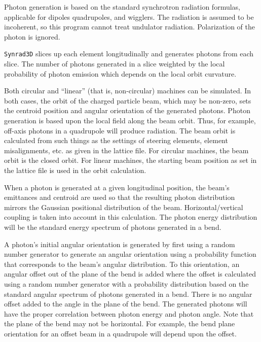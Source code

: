 \documentclass[11pt]{article}
\newcommand{\srthree}{\texttt{Synrad3D}\xspace}
\begin{document}
Photon generation is based on the standard synchrotron radiation
formulas, applicable for dipoles quadrupoles, and wigglers. The
radiation is assumed to be incoherent, so this program cannot treat
undulator radiation. Polarization of the photon is ignored.

\srthree slices up each element longitudinally
and generates photons from each slice. The number of photons generated
in a slice weighted by the local probability of photon emission which
depends on the local orbit curvature.

Both circular and ``linear'' (that is, non-circular) machines can be
simulated.  In both cases, the orbit of the charged particle beam,
which may be non-zero, sets the centroid position and angular
orientation of the generated photons. Photon generation is based upon
the local field along the beam orbit. Thus, for example, off-axis
photons in a quadrupole will produce radiation. The beam orbit is
calculated from such things as the settings of steering elements,
element misalignments, etc. as given in the lattice file. For circular
machines, the beam orbit is the closed orbit. For linear machines, the
starting beam position as set in the lattice file is used in the orbit
calculation.

When a photon is generated at a given longitudinal position, the
beam's emittances and centroid are used so that the resulting photon
distribution mirrors the Gaussian positional distribution of the beam.
Horizontal/vertical coupling is taken into account in this
calculation. The photon energy distribution will be the standard
energy spectrum of photons generated in a bend.

A photon's initial angular orientation is generated by first using a
random number generator to generate an angular orientation using a
probability function that corresponds to the beam's angular
distribution. To this orientation, an angular offset out of the plane
of the bend is added where the offset is calculated using a random
number generator with a probability distribution based on the standard
angular spectrum of photons generated in a bend. There is no angular
offset added to the angle in the plane of the bend. The generated
photons will have the proper correlation between photon energy and
photon angle. Note that the plane of the bend may not be
horizontal. For example, the bend plane orientation for an offset beam
in a quadrupole will depend upon the offset.

\end{document}
